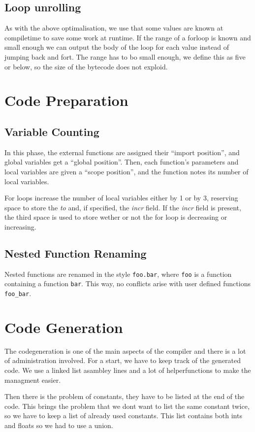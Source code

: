 \documentclass[a4paper,11pt]{report}
\begin{document}
\subsection{Loop unrolling}
As with the above optimalisation, we use that some values are known at compiletime to save some work at runtime.
If the range of a forloop is known and small enough we can output the body of the loop for each value instead of jumping back and fort.
The range has to bo small enough, we define this as five or below, so the size of the bytecode does not exploid.


\section{Code Preparation}
\subsection{Variable Counting}
In this phase, the external functions are assigned their ``import position'', and global variables get a ``global position''. Then, each function's parameters and local variables are given a ``scope position'', and the function notes its number of local variables. 

For loops increase the number of local variables either by 1 or by 3, reserving space to store the \emph{to} and, if specified, the \emph{incr} field. If the \emph{incr} field is present, the third space is used to store wether or not the for loop is decreasing or increasing.
\subsection{Nested Function Renaming}
Nested functions are renamed in the style \texttt{foo.bar}, where \texttt{foo} is a function containing a function \texttt{bar}. This way, no conflicts arise with user defined functions \texttt{foo\_bar}.

\section{Code Generation}
The codegeneration is one of the main aspects of the compiler and there is a lot of administration involved.
For a start, we have to keep track of the generated code.
We use a linked list asambley lines and a lot of helperfunctions to make the managment easier.

Then there is the problem of constants, they have to be listed at the end of the code.
This brings the problem that we dont want to list the same constant twice, so we have to keep a list of already used constants.
This list contains both ints and floats so we had to use a union.
 
\end{document}
